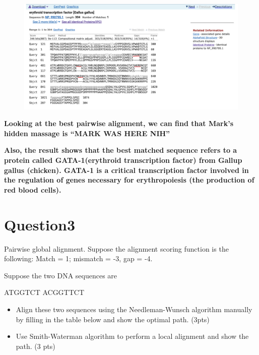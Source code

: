\documentclass{article}
\begin{document}
\begin{figure}[H] %
    \centering
    \includegraphics[width=1\textwidth]{q2.png}  %

\end{figure}

\textbf{Looking at the best pairwise alignment, we can find that Mark's hidden massage is ``MARK WAS HERE NIH''}

\textbf{Also, the result shows that the best matched sequence refers to a protein called GATA-1(erythroid transcription factor) from Gallup gallus (chicken). GATA-1 is a critical transcription factor involved in the regulation of genes necessary for erythropoiesis (the production of red blood cells).
}

\section{Question3}
Pairwise global alignment. Suppose the alignment scoring function is the following:
Match = 1; mismatch = -3, gap = -4. 

	Suppose the two DNA sequences are 
	
    ATGGTCT
	ACGGTTCT

    \begin{itemize} %
        \item Align these two sequences using the Needleman-Wunsch algorithm manually by filling in the table below and show the optimal path. (3pts)
        \item Use Smith-Waterman algorithm to perform a local alignment and show the path. (3 pts)

\end{itemize}
\end{document}
